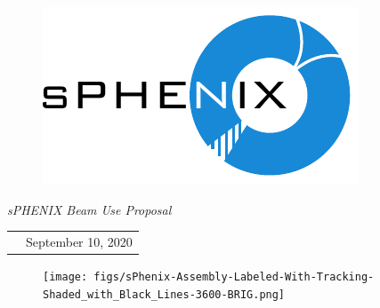 \renewcommand*\familydefault{\sfdefault}
{\sffamily
\vfill
\vspace{4cm}
\begin{figure}[H]
  \begin{center}
  \includegraphics[width=0.6\linewidth]{figs/sPHENIX}
  \end{center}
\end{figure}

\vfill

\begin{center}
  \large
  \emph{\Large{sPHENIX Beam Use Proposal}}

  \begin{tabular}{rl}
  &September 10, 2020 \\
  \end{tabular}
\end{center}

\vspace{2cm}

\begin{figure}[htpb]
\begin{center}
\texttt{[image: figs/sPhenix-Assembly-Labeled-With-Tracking-Shaded\_with\_Black\_Lines-3600-BRIG.png]}
\end{center}
\end{figure}

}



\renewcommand*\familydefault{\rmdefault}
